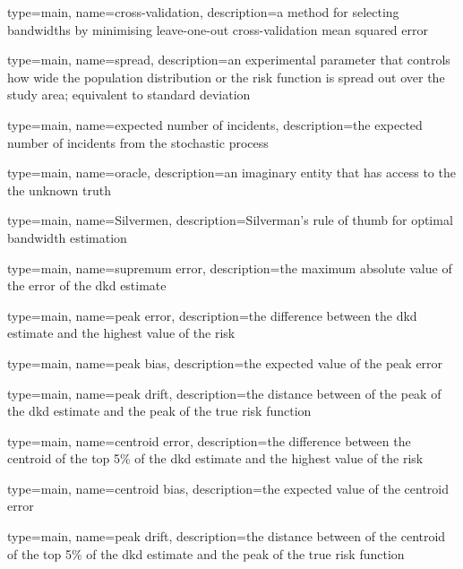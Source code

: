

 {
   type=main,
   name={cross-validation},
   description={a method for selecting bandwidths by minimising leave-one-out cross-validation mean squared error}
}

 {
   type=main,
   name={spread},
   description={an experimental parameter that controls how wide the population distribution or the risk function is spread out over the study area; equivalent to standard deviation}
}

{%
   type=main,
   name={expected number of incidents},
   description={the expected number of incidents from the stochastic process}
}

 {
   type=main,
   name={oracle},
   description={an imaginary entity that has access to the the unknown truth}
}

 {
   type=main,
   name={Silvermen},
   description={Silverman's rule of thumb for optimal bandwidth estimation}
}

{%
   type=main,
   name={supremum error},
   description={the maximum absolute value of the error of the dkd estimate}
}

{%
   type=main,
   name={peak error},
   description={the difference between the dkd estimate and the highest value of the risk}
}

{%
   type=main,
   name={peak bias},
   description={the expected value of the peak error}
}

{%
   type=main,
   name={peak drift},
   description={the distance between of the peak of the dkd estimate and the peak of the true risk function}
}

{%
   type=main,
   name={centroid error},
   description={the difference between the centroid of the top 5\% of the dkd estimate and the highest value of the risk}
}

{%
   type=main,
   name={centroid bias},
   description={the expected value of the centroid error}
}

{%
   type=main,
   name={peak drift},
   description={the distance between of the centroid of the top 5\% of the dkd estimate and the peak of the true risk function}
}



